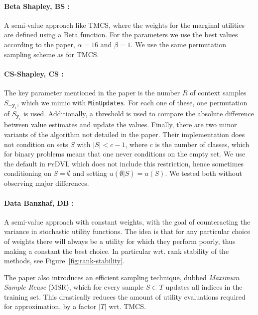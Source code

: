 \documentclass[10pt]{article}
\newcommand{\tmem}[1]{{\em #1\/}}
\newcommand{\tmmathbf}[1]{\ensuremath{\boldsymbol{#1}}}
\newcommand{\tmname}[1]{\textsc{#1}}
\newcommand{\python}[1]{\texttt{#1}}
\begin{document}
\paragraph{Beta Shapley, BS {\citep{kwon_beta_2022}}:}A semi-value approach
like TMCS, where the weights for the marginal utilities are defined using a
Beta function. For the parameters we use the best values according to the
paper, $\alpha = 16$ and $\beta = 1$. We use the same permutation sampling
scheme as for TMCS.

\paragraph{CS-Shapley, CS {\citep{schoch_csshapley_2022}}:}The key parameter
mentioned in the paper is the number $R$ of context samples
$S_{-\tmmathbf{y}_i}$, which we mimic with {\small{{\python{MinUpdates}}}}.
For each one of these, one permutation of $S_{\tmmathbf{y}_i}$ is used.
Additionally, a threshold is used to compare the absolute difference between
value estimates and update the values. Finally, there are two minor variants
of the algorithm not detailed in the paper. Their implementation does not
condition on sets $S$ with $| S | < c - 1$, where $c$ is the number of
classes, which for binary problems means that one never conditions on the
empty set. We use the default in {\tmname{pyDVL}} which does not include this
restriction, hence sometimes conditioning on $S = \emptyset$ and setting $u
(\emptyset |S) = u (S)$. We tested both without observing major differences.

\paragraph{Data Banzhaf, DB {\citep{wang_data_2023}}:}A semi-value approach
with constant weights, with the goal of counteracting the variance in
stochastic utility functions. The idea is that for any particular choice of
weights there will always be a utility for which they perform poorly, thus
making a constant the best choice. In particular wrt. rank stability of the
methods, see  Figure~\ref{fig:rank-stability}.

The paper also introduces an efficient sampling technique, dubbed
{\tmem{Maximum Sample Reuse}} (MSR), which for every sample $S \subset T$
updates all indices in the training set. This drastically reduces the amount
of utility evaluations required for approximation, by a factor $| T |$ wrt.
TMCS.
\end{document}

